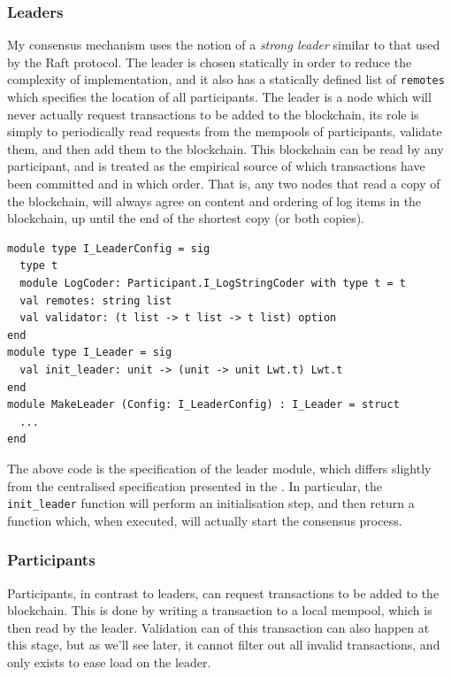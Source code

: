 \documentclass[12pt,a4paper,twoside,openright]{report}
\begin{document}
			\subsubsection*{Leaders}
			My consensus mechanism uses the notion of a \textit{strong leader} similar to that used by the Raft protocol. 
			The leader is chosen statically in order to reduce the complexity of implementation, and it also has a statically defined list of \texttt{remotes} which specifies the location of all participants.
			The leader is a node which will never actually request transactions to be added to the blockchain, its role is simply to periodically read requests from the mempools of participants, validate them, and then add them to the blockchain.
			This blockchain can be read by any participant, and is treated as the empirical source of which transactions have been committed and in which order. 
			That is, any two nodes that read a copy of the blockchain, will always agree on content and ordering of log items in the blockchain, up until the end of the shortest copy (or both copies).\\

			\begin{lstlisting}
module type I_LeaderConfig = sig
  type t
  module LogCoder: Participant.I_LogStringCoder with type t = t    
  val remotes: string list
  val validator: (t list -> t list -> t list) option
end
module type I_Leader = sig
  val init_leader: unit -> (unit -> unit Lwt.t) Lwt.t
end
module MakeLeader (Config: I_LeaderConfig) : I_Leader = struct
  ...
end
			\end{lstlisting}

			The above code is the specification of the leader module, which differs slightly from the centralised specification presented in the .
			In particular, the \texttt{init\_leader} function will perform an initialisation step, and then return a function which, when executed, will actually start the consensus process.

			\subsubsection*{Participants}
			Participants, in contrast to leaders, can request transactions to be added to the blockchain. 
			This is done by writing a transaction to a local mempool, which is then read by the leader.
			Validation can of this transaction can also happen at this stage, but as we'll see later, it cannot filter out all invalid transactions, and only exists to ease load on the leader.\\
\end{document}
